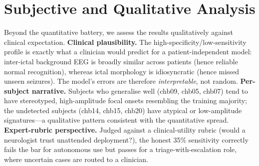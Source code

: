 \documentclass[10pt,journal,twocolumn]{IEEEtran}
\begin{document}
\section{Subjective and Qualitative Analysis}
Beyond the quantitative battery, we assess the results qualitatively against clinical expectation. \textbf{Clinical plausibility.} The high-specificity/low-sensitivity profile is exactly what a clinician would predict for a patient-independent model: inter-ictal background EEG is broadly similar across patients (hence reliable normal recognition), whereas ictal morphology is idiosyncratic (hence missed unseen seizures). The model's errors are therefore \emph{interpretable}, not random. \textbf{Per-subject narrative.} Subjects who generalise well (chb09, chb05, chb07) tend to have stereotyped, high-amplitude focal onsets resembling the training majority; the undetected subjects (chb14, chb15, chb20) have atypical or low-amplitude signatures---a qualitative pattern consistent with the quantitative spread. \textbf{Expert-rubric perspective.} Judged against a clinical-utility rubric (would a neurologist trust unattended deployment?), the honest 35\% sensitivity correctly fails the bar for autonomous use but passes for a triage-with-escalation role, where uncertain cases are routed to a clinician.
\end{document}
